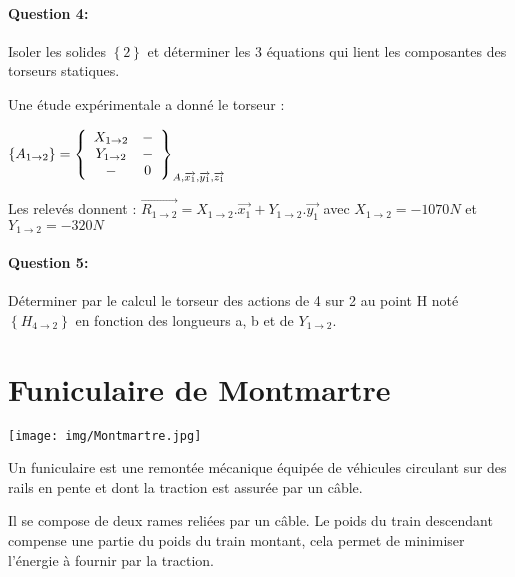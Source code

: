 \paragraph{Question 4:} Isoler les solides $\left\{2\right\}$ et déterminer les 3 équations qui lient les composantes des torseurs statiques.

Une étude expérimentale a donné le torseur :

$\left\{A_{1 \rightarrow 2}\right\}=\left\{\begin{array}{c c}
X_{1 \rightarrow 2} & - \\
Y_{1 \rightarrow 2} & - \\
- & 0
\end{array}\right\}_{A,\overrightarrow{x_1},\overrightarrow{y_1},\overrightarrow{z_1}}$

Les relevés donnent : $\overrightarrow{R_{1 \rightarrow 2}}=X_{1 \rightarrow 2}.\overrightarrow{x_1}+Y_{1 \rightarrow 2}.\overrightarrow{y_1}$ avec $X_{1 \rightarrow 2}= -1070 N$ et $Y_{1 \rightarrow 2} = -320 N$

\paragraph{Question 5:} Déterminer par le calcul le torseur des actions de 4 sur 2 au point H noté $\left\{H_{4 \rightarrow 2}\right\}$ en fonction des longueurs a, b et de $Y_{1 \rightarrow 2}$.



\newpage

\section{Funiculaire de Montmartre}

\begin{minipage}{0.4\linewidth}
 \centering\texttt{[image: img/Montmartre.jpg]}
\end{minipage}
\hfill
\begin{minipage}{0.57\linewidth}
Un funiculaire est une remontée mécanique équipée de véhicules circulant sur des rails en pente et dont la traction est assurée par un câble.

Il se compose de deux rames reliées par un câble. Le poids du train descendant compense une partie du poids du train montant, cela permet de minimiser l'énergie à fournir par la traction.
\end{minipage}


